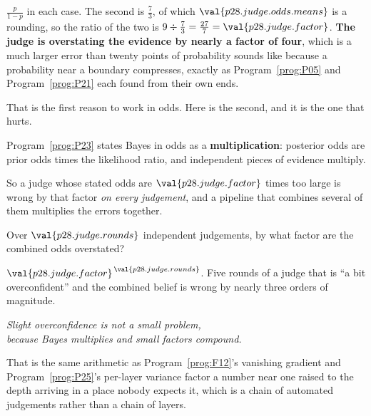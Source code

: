 \begin{fr}

$\frac{p}{1-p}$ in each case. The second is $\frac{7}{3}$, of which
$\val{p28.judge.odds.means}$ is a rounding, so the ratio of the two is
$9 \div \frac{7}{3} = \frac{27}{7} = \val{p28.judge.factor}$. \textbf{The
judge is overstating the evidence by
nearly a factor of four}, which is a much larger error than twenty points of
probability sounds like \dash{} because a probability near a boundary
compresses, exactly as Program~\ref{prog:P05} and Program~\ref{prog:P21} each
found from their own ends.

That is the first reason to work in odds. Here is the second, and it is the
one that hurts.
\end{fr}

\begin{fr}
Program~\ref{prog:P23} states Bayes in odds as a \textbf{multiplication}:
posterior odds are prior odds times the likelihood ratio, and independent
pieces of evidence multiply.

So a judge whose stated odds are $\val{p28.judge.factor}$ times too large is
wrong by that factor \emph{on every judgement}, and a pipeline that combines
several of them multiplies the errors together.

Over $\val{p28.judge.rounds}$ independent judgements, by what factor are the
combined odds overstated?
\dotline
\nextframe
\end{fr}

\begin{fr}

$\val{p28.judge.factor}^{\,\val{p28.judge.rounds}}$. Five rounds of a judge
that is \enquote{a bit overconfident} and the combined belief is wrong by
nearly three orders of magnitude.

\begin{center}
\emph{Slight overconfidence is not a small problem,\\
because Bayes multiplies and small factors compound.}
\end{center}

That is the same arithmetic as Program~\ref{prog:F12}'s vanishing gradient and
Program~\ref{prog:P25}'s per-layer variance factor \dash{} a number near one
raised to the depth \dash{} arriving in a place nobody expects it, which is a
chain of automated judgements rather than a chain of layers.
\end{fr}

